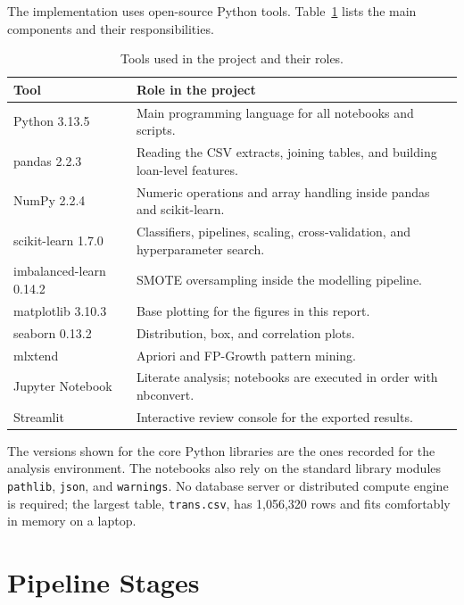 The implementation uses open-source Python tools. Table~\ref{tab:stack} lists the main components and their responsibilities.

\begin{table}[H]
    \centering
    \caption{Tools used in the project and their roles.}
    \label{tab:stack}
    \begin{tabularx}{\textwidth}{@{}lX@{}}
        \toprule
        \textbf{Tool} & \textbf{Role in the project} \\
        \midrule
        Python 3.13.5 & Main programming language for all notebooks and scripts. \\
        pandas 2.2.3 & Reading the CSV extracts, joining tables, and building loan-level features. \\
        NumPy 2.2.4 & Numeric operations and array handling inside pandas and scikit-learn. \\
        scikit-learn 1.7.0 & Classifiers, pipelines, scaling, cross-validation, and hyperparameter search. \\
        imbalanced-learn 0.14.2 & SMOTE oversampling inside the modelling pipeline. \\
        matplotlib 3.10.3 & Base plotting for the figures in this report. \\
        seaborn 0.13.2 & Distribution, box, and correlation plots. \\
        mlxtend & Apriori and FP-Growth pattern mining. \\
        Jupyter Notebook & Literate analysis; notebooks are executed in order with nbconvert. \\
        Streamlit & Interactive review console for the exported results. \\
        \bottomrule
    \end{tabularx}
\end{table}

The versions shown for the core Python libraries are the ones recorded for the analysis environment. The notebooks also rely on the standard library modules \texttt{pathlib}, \texttt{json}, and \texttt{warnings}. No database server or distributed compute engine is required; the largest table, \texttt{trans.csv}, has 1,056,320 rows and fits comfortably in memory on a laptop.

\section{Pipeline Stages}
\label{sec:pipeline-stages}

